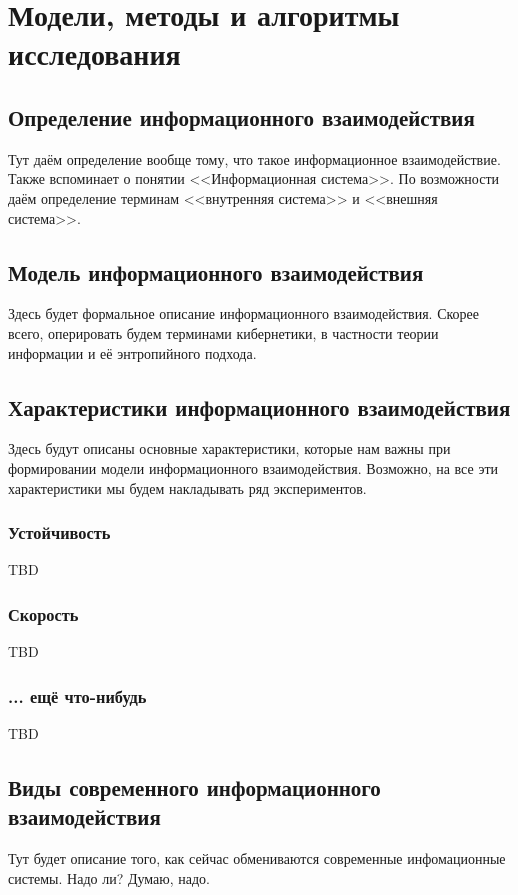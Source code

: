 \section{Модели, методы и алгоритмы исследования}

\subsection{Определение информационного взаимодействия}

Тут даём определение вообще тому, что такое информационное взаимодействие.
Также вспоминает о понятии <<Информационная система>>.
По возможности даём определение терминам <<внутренняя система>> и <<внешняя система>>.

\subsection{Модель информационного взаимодействия}

Здесь будет формальное описание информационного взаимодействия.
Скорее всего, оперировать будем терминами кибернетики, в частности теории информации и её энтропийного подхода.

\subsection{Характеристики информационного взаимодействия}

Здесь будут описаны основные характеристики, которые нам важны при формировании модели информационного взаимодействия.
Возможно, на все эти характеристики мы будем накладывать ряд экспериментов.

\subsubsection{Устойчивость}

TBD

\subsubsection{Скорость}

TBD

\subsubsection{... ещё что-нибудь}

TBD

\subsection{Виды современного информационного взаимодействия}

Тут будет описание того, как сейчас обмениваются современные инфомационные системы.
Надо ли?
Думаю, надо.

\clearpage
\newpage